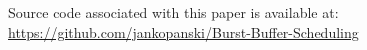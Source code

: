 \documentclass[runningheads]{llncs}
\begin{document}


\noindent Source code associated with this paper is available at:\\
\url{https://github.com/jankopanski/Burst-Buffer-Scheduling}






\end{document}
